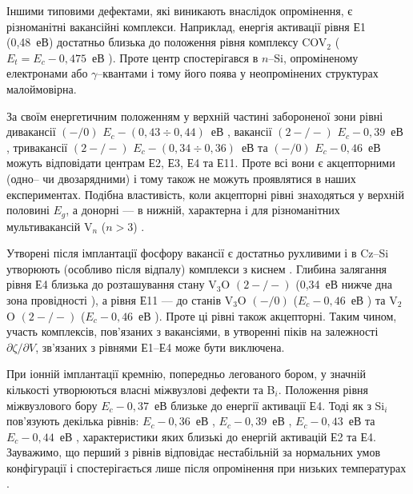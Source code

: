 Іншими типовими дефектами, які виникають внаслідок опромінення, є різноманітні
вакансійні комплекси.
Наприклад, енергія активації рівня Е1 (0,48~еВ) достатньо близька до положення рівня
комплексу COV$_2$  ($E_t=E_c-0,475$~еВ \cite{Lugakov}).
Проте центр спостерігався в $n$--Si, опроміненому електронами або $\gamma$--квантами \cite{Lugakov} і тому його поява у неопромінених структурах малоймовірна.

За своїм енергетичним положенням у верхній частині
забороненої зони рівні дивакансії $(-/0)$ $E_c-(0,43\div0,44)$~еВ \cite{V2:JAP2014,V2:PRB2002},
вакансії $(2-/-)$ $E_c-0,39$~еВ \cite{MSER55},
тривакансії $(2-/-)$ $E_c-(0,34\div0,36)$~еВ та $(-/0)$ $E_c-0,46$~еВ \cite{V3:PRB2012,V3:Markevich}
можуть відповідати центрам Е2, Е3, Е4 та Е11.
Проте всі вони є акцепторними (одно-- чи двозарядними) і тому також не можуть проявлятися
в наших експериментах.
Подібна властивість, коли акцепторні рівні знаходяться у верхній половині $E_g$,
а донорні --- в нижній, характерна і для різноманітних мультивакансій V$_n$ ($n>3$) \cite{Si:multiV}.

Утворені після імплантації фосфору вакансії є достатньо рухливими і в Cz--Si
утворюють (особливо після відпалу) комплекси з киснем \cite{V2toV2O}.
Глибина залягання рівня Е4 близька до розташування стану V$_3$O $(2-/-)$ (0,34~еВ нижче дна зона провідності \cite{V3:Markevich}),
а рівня Е11 --- до станів V$_3$O $(-/0)$ ($E_c-0,46$~еВ \cite{V3:Markevich})
та V$_2$O $(2-/-)$ ($E_c-0,46$~еВ \cite{V2:JAP2014}).
Проте ці рівні також акцепторні.
Таким чином, участь комплексів, пов'язаних з вакансіями, в утворенні
піків на залежності $\partial \zeta/ \partial V $, зв'язаних з рівнями Е1--Е4 може бути виключена.

При іонній імплантації кремнію, попередньо легованого бором,
у значній кількості утворюються власні міжвузлові дефекти та B$_i$.
Положення рівня міжвузлового бору $E_c-0,37$~еВ \cite{Bi:Harris} близьке до  енергії активації Е4.
Тоді як з Si$_i$ пов'язують декілька рівнів: $E_c-0,36$~еВ \cite{MSER55},
$E_c-0,39$~еВ \cite{MSER55,Si:Sii}, $E_c-0,43$~еВ \cite{Si:Sii} та
$E_c-0,44$~еВ \cite{VI:Luc}, характеристики яких близькі до енергій активацій Е2 та Е4.
Зауважимо, що перший з рівнів відповідає нестабільній за нормальних умов конфігурації і спостерігається лише після опромінення при низьких температурах \cite{MSER55}.

